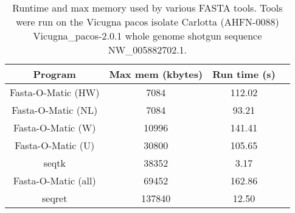 \documentclass{bmcart}
\begin{document}
\begin{backmatter}
\begin{table}[h!]
 \caption{Runtime and max memory used by various FASTA tools. Tools were run on the Vicugna pacos isolate Carlotta (AHFN-0088) Vicugna_pacos-2.0.1 whole genome shotgun sequence NW_005882702.1.} 
    \begin{tabular}{ cccc }
        Program & Max mem (kbytes) & Run time (s) \\ \hline
        Fasta-O-Matic (HW) & 7084 & 112.02 \\ 
        Fasta-O-Matic (NL) & 7084 & 93.21 \\ 
        Fasta-O-Matic (W) & 10996 & 141.41 \\ 
        Fasta-O-Matic (U) & 30800 & 105.65 \\ 
        seqtk & 38352 & 3.17 \\ 
        Fasta-O-Matic (all) & 69452 & 162.86 \\ 
        seqret & 137840 & 12.50 \\
    \end{tabular} 
 
\end{table}





\end{backmatter}
\end{document}
